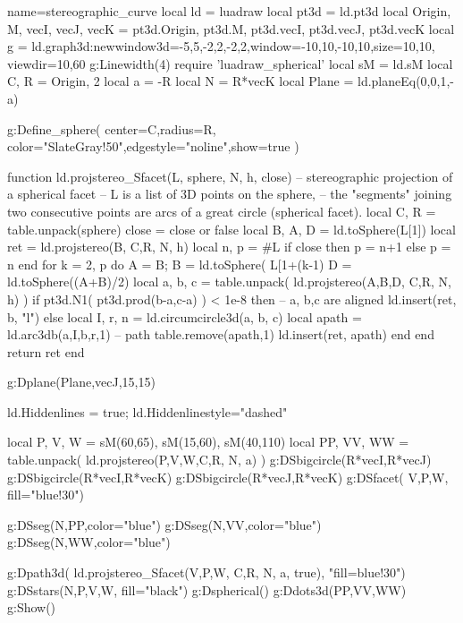 \documentclass{standalone}
\begin{document}
\begin{luadraw}{name=stereographic_curve}
local ld = luadraw
local pt3d = ld.pt3d
local Origin, M, vecI, vecJ, vecK = pt3d.Origin, pt3d.M, pt3d.vecI, pt3d.vecJ, pt3d.vecK
local g = ld.graph3d:new{window3d={-5,5,-2,2,-2,2},window={-10,10,-10,10},size={10,10}, viewdir={10,60}} 
g:Linewidth(4)
require 'luadraw_spherical'
local sM =  ld.sM
local C, R = Origin, 2
local a = -R
local N = R*vecK
local Plane = ld.planeEq(0,0,1,-a)

g:Define_sphere( {center=C,radius=R, color="SlateGray!50",edgestyle="noline",show=true} ) 

function ld.projstereo_Sfacet(L, sphere, N, h, close) -- stereographic projection of a spherical facet
-- L is a list of 3D points on the sphere, 
-- the "segments" joining two consecutive points are arcs of a great circle (spherical facet).
    local C, R = table.unpack(sphere)
    close = close or false
    local B, A, D = ld.toSphere(L[1])
    local ret = {ld.projstereo(B, {C,R}, N, h)}
    local n, p = #L
    if close then p = n+1 else p = n end
    for k = 2, p do
        A = B; B = ld.toSphere( L[1+(k-1)%
        D = ld.toSphere((A+B)/2)
        local a, b, c = table.unpack( ld.projstereo({A,B,D}, {C,R}, N, h) )
        if pt3d.N1( pt3d.prod(b-a,c-a) ) < 1e-8 then -- a, b,c are aligned
            ld.insert(ret, {b, "l"})
        else
            local I, r, n = ld.circumcircle3d(a, b, c)
            local apath = ld.arc3db(a,I,b,r,1) -- path
            table.remove(apath,1)
            ld.insert(ret, apath)
        end
    end
    return ret
end

g:Dplane(Plane,vecJ,15,15)

ld.Hiddenlines = true; ld.Hiddenlinestyle="dashed"

local P, V, W = sM(60,65), sM(15,60), sM(40,110)
local PP, VV, WW = table.unpack( ld.projstereo({P,V,W},{C,R}, N, a) )
g:DSbigcircle({R*vecI,R*vecJ})
g:DSbigcircle({R*vecI,R*vecK})
g:DSbigcircle({R*vecJ,R*vecK})
g:DSfacet( {V,P,W}, {fill="blue!30"})

g:DSseg({N,PP},{color="blue"})
g:DSseg({N,VV},{color="blue"})
g:DSseg({N,WW},{color="blue"})

g:Dpath3d( ld.projstereo_Sfacet({V,P,W}, {C,R}, N, a, true), "fill=blue!30")
g:DSstars({N,P,V,W}, {fill="black"})
g:Dspherical()
g:Ddots3d({PP,VV,WW})
g:Show()
\end{luadraw}
\end{document}
